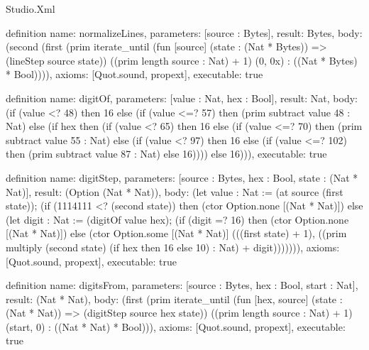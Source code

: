 \begin{lexlean}{Studio.Xml}
\begin{semanticmodule}
definition{
  name: normalizeLines,
  parameters: [source : Bytes],
  result: Bytes,
  body: (second (first (prim iterate_until (fun [source] (state : (Nat * Bytes)) => (lineStep source state)) ((prim length source : Nat) + 1) (0, 0x) : ((Nat * Bytes) * Bool)))),
  axioms: [Quot.sound, propext],
  executable: true
}

definition{
  name: digitOf,
  parameters: [value : Nat, hex : Bool],
  result: Nat,
  body: (if (value <? 48) then 16 else (if (value <=? 57) then (prim subtract value 48 : Nat) else (if hex then (if (value <? 65) then 16 else (if (value <=? 70) then (prim subtract value 55 : Nat) else (if (value <? 97) then 16 else (if (value <=? 102) then (prim subtract value 87 : Nat) else 16)))) else 16))),
  executable: true
}

definition{
  name: digitStep,
  parameters: [source : Bytes, hex : Bool, state : (Nat * Nat)],
  result: (Option (Nat * Nat)),
  body: (let value : Nat := (at source (first state)); (if (1114111 <? (second state)) then (ctor Option.none [(Nat * Nat)]) else (let digit : Nat := (digitOf value hex); (if (digit =? 16) then (ctor Option.none [(Nat * Nat)]) else (ctor Option.some [(Nat * Nat)] (((first state) + 1), ((prim multiply (second state) (if hex then 16 else 10) : Nat) + digit))))))),
  axioms: [Quot.sound, propext],
  executable: true
}

definition{
  name: digitsFrom,
  parameters: [source : Bytes, hex : Bool, start : Nat],
  result: (Nat * Nat),
  body: (first (prim iterate_until (fun [hex, source] (state : (Nat * Nat)) => (digitStep source hex state)) ((prim length source : Nat) + 1) (start, 0) : ((Nat * Nat) * Bool))),
  axioms: [Quot.sound, propext],
  executable: true
}


\end{semanticmodule}
\end{lexlean}
